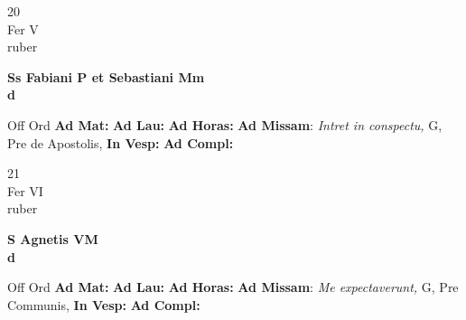 \documentclass[10pt, openany]{book}
\begin{document}
        \begin{center}
            \begin{minipage}{3.5in}
                \vspace{2em}
                \begin{minipage}{0.5in}
                    {\Huge 20} \\
                    {\normalsize Fer V} \\
                    {\normalsize ruber}
                \end{minipage}
                \begin{minipage}{3.0in}
                    \textbf{ \large Ss Fabiani P et Sebastiani Mm \\
                    \textnormal{\normalsize d}} \\ 
                \end{minipage}
                \begin{justify}Off Ord
                    \textbf{Ad Mat: }
                    \textbf{Ad Lau: }
                    \textbf{Ad Horas: }\textbf{Ad Missam}: \textit{Intret in conspectu,} G, Pre de Apostolis,  
                    \textbf{In Vesp: }
                    \textbf{Ad Compl: }
                \end{justify}
            \end{minipage}
        \end{center}
    
        \begin{center}
            \begin{minipage}{3.5in}
                \vspace{2em}
                \begin{minipage}{0.5in}
                    {\Huge 21} \\
                    {\normalsize Fer VI} \\
                    {\normalsize ruber}
                \end{minipage}
                \begin{minipage}{3.0in}
                    \textbf{ \large S Agnetis VM \\
                    \textnormal{\normalsize d}} \\ 
                \end{minipage}
                \begin{justify}Off Ord
                    \textbf{Ad Mat: }
                    \textbf{Ad Lau: }
                    \textbf{Ad Horas: }\textbf{Ad Missam}: \textit{Me expectaverunt,} G, Pre Communis,  
                    \textbf{In Vesp: }
                    \textbf{Ad Compl: }
                \end{justify}
            \end{minipage}
        \end{center}
    
\end{document}
